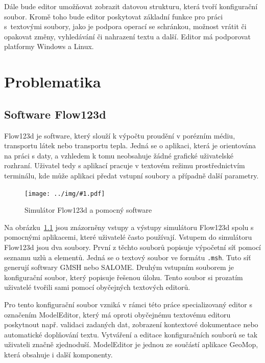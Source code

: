 \documentclass[FM,bw,DP]{tulthesis}
\newcommand{\includeimg}[2]{%
\begin{figure}[h]
	\centering
    \texttt{[image: ../img/\#1.pdf]}
    \caption{#2}
	\label{img:#1}
\end{figure}
}
\begin{document}
Dále bude editor umožňovat zobrazit datovou strukturu, která tvoří konfigurační soubor. Kromě toho bude editor poskytovat základní funkce pro práci s~textovými soubory, jako je podpora operací se schránkou, možnost vrátit či opakovat změny, vyhledávání či nahrazení textu a další. Editor má podporovat platformy Windows a Linux.



\chapter{Problematika}





\section{Software Flow123d}

Flow123d je software, který slouží k výpočtu proudění v porézním médiu, transportu látek nebo transportu tepla. Jedná se o aplikaci, která je orientována na práci s daty, a vzhledem k tomu neobsahuje žádné grafické uživatelské rozhraní. Uživatel tedy s aplikací pracuje v textovém režimu prostřednictvím terminálu, kde může aplikaci předat vstupní soubory a případně další parametry.

\includeimg{flow123d}{Simulátor Flow123d a pomocný software}

Na obrázku~\ref{img:flow123d} jsou znázorněny vstupy a výstupy simulátoru Flow123d spolu s pomocnými aplikacemi, které uživatelé často používají. Vstupem do simulátoru Flow123d jsou dva soubory. První z těchto souborů popisuje výpočetní síť pomocí seznamu uzlů a elementů. Jedná se o textový soubor ve formátu \texttt{.msh}. Tuto síť generují softwary GMSH nebo SALOME. Druhým vstupním souborem je konfigurační soubor, který popisuje řešenou úlohu. Tento soubor si prozatím uživatelé tvořili sami pomocí obyčejných textových editorů.

Pro tento konfigurační soubor vzniká v rámci této práce specializovaný editor s označením ModelEditor, který má oproti obyčejnému textovému editoru poskytnout např. validaci zadaných dat, zobrazení kontextové dokumentace nebo automatické doplňování textu. Vytváření a editace konfiguračních souborů se tak uživateli značně zjednoduší. ModelEditor je jednou ze součástí aplikace GeoMop, která obsahuje i další komponenty.
\end{document}
